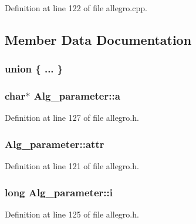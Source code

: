 Definition at line 122 of file allegro.\+cpp.



\subsection{Member Data Documentation}
\subsubsection[{\texorpdfstring{"@224}{@224}}]{\setlength{\rightskip}{0pt plus 5cm}union \{ ... \} }\hypertarget{class_alg__parameter_a96a6beb77547fb30f19db44b9269009d}{}\label{class_alg__parameter_a96a6beb77547fb30f19db44b9269009d}
\subsubsection[{\texorpdfstring{a}{a}}]{ char$\ast$ Alg\+\_\+parameter\+::a}\hypertarget{class_alg__parameter_a0299bf397a425aedd5d302d35b4f02f5}{}\label{class_alg__parameter_a0299bf397a425aedd5d302d35b4f02f5}


Definition at line 127 of file allegro.\+h.

\subsubsection[{\texorpdfstring{attr}{attr}}]{ Alg\+\_\+parameter\+::attr}\hypertarget{class_alg__parameter_a0971b7211b4b5f5a4b568c82ee2cca8c}{}\label{class_alg__parameter_a0971b7211b4b5f5a4b568c82ee2cca8c}


Definition at line 121 of file allegro.\+h.

\subsubsection[{\texorpdfstring{i}{i}}]{\setlength{\rightskip}{0pt plus 5cm}long Alg\+\_\+parameter\+::i}\hypertarget{class_alg__parameter_aafa3c754f8af41b8e70668fae4370339}{}\label{class_alg__parameter_aafa3c754f8af41b8e70668fae4370339}


Definition at line 125 of file allegro.\+h.


